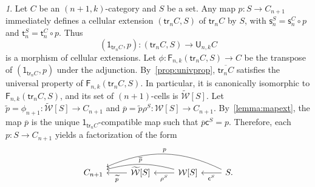 \documentclass[reqno]{amsart}
\theoremstyle{plain}
\theoremstyle{definition}
\theoremstyle{remark}
\newtheorem{paragr}[subsubsection]{} %
\newcommand{\pair}[2]{(#1,#2)}       %
\newcommand{\source}{\mathsf{s}} %
\newcommand{\target}{\mathsf{t}} %
\newcommand{\Unit}[1]{\mathsf{1}_{#1}}%
\newcommand{\functor}[1]{\mathsf{#1}} %
\newcommand{\trk}[1]{\functor{tr}_{#1}}%
\newcommand{\fgf}[1]{\functor{U}_{#1}} %
\newcommand{\frf}[1]{\functor{F}_{#1}} %
\newcommand{\sce}[1]{\source_{#1}} %
\newcommand{\tge}[1]{\target_{#1}} %
\newcommand{\clx}[2]{\pair{#1}{#2}}%
\newcommand{\WW}{\mathcal{W}}
\newcommand{\clWW}{\fcls{\WW}}
\newcommand{\wtx}[1]{\WW[#1]} %
\newcommand{\wtxeq}[1]{\clWW[#1]} %
\newcommand{\formal}[1]{\mathsf{#1}} %
\newcommand{\cans}[1]{\rho^{#1}} %
\newcommand{\fcls}[1]{\widetilde{#1}}%
\newcommand{\finc}[1]{\formal{c}^{#1}}%
\newcommand{\extend}[1]{\overline{#1}} %
\begin{document}
\begin{paragr}\label{paragr:addproperties}
  Let $C$ be an $\pair{n{+}1}{k}$-category and $S$ be a set. Any map
  $p:S\to C_{n+1}$ immediately defines a cellular extension $\clx{\trk n C}{S}$ of
  $\trk n C$ by $S$, with $\sce n^S=\sce n^C\circ p$ and $\tge
  n^S=\tge n^C\circ p$. Thus
\[\pair{\Unit{\trk n C}}{p}:\clx{\trk n C}{S}\to\fgf{n,k}C\]
is a morphism of cellular extensions.
Let $\phi:\frf{n,k}\clx{\trk n C}{S}\to C$ be the transpose of $\pair{\Unit{\trk n C}}{p}$ under the adjunction.
By~\cref{prop:univprop}, $\extend{\trk n C}$ satisfies the universal property
of
$\frf{n,k}\clx{\trk n C}S$. In particular, it is canonically isomorphic to
$\frf{n,k}\clx{\trk n C}S$, and its set of $(n{+}1)$-cells is $\wtxeq S$.
 Let $\fcls
p=\phi_{n+1}:\wtxeq S\to C_{n+1}$ and $\extend p=\fcls p\cans S:\wtx
S\to C_{n+1}$. By~\cref{lemma:mapext}, the map $\extend p$ is the
unique $\Unit{\trk nC}$-compatible map such that $\extend p\finc
S=p$. Therefore, each $p:S\to C_{n+1}$ yields a factorization of the
form
\begin{equation}
  \label{eq:factor}
  \begin{tikzcd}
    C_{n+1} & \wtxeq S\ar[l,"\fcls{p}"] & \wtx S
      \ar[l,"\cans{S}"]\ar[ll,bend right=15,"\extend{p}"']& S\ar[l,"\finc{S}"]
      \ar[lll,bend right=25,"p"'].
  \end{tikzcd}
\end{equation}
\end{paragr}
\end{document}
